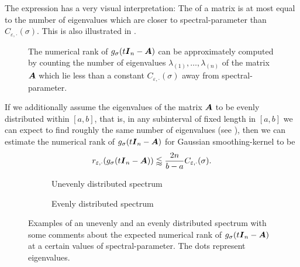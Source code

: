 The expression  has a very
visual interpretation: The  of a matrix is at most
equal to the number of eigenvalues which are closer to \gls{spectral-parameter}
than $C_{\varepsilon, \cdot}(\sigma)$.
This is also illustrated in .\\
\begin{figure}[ht]
    \centering
    
    \caption{The numerical rank of $g_{\sigma}(t\boldsymbol{I}_n - \boldsymbol{A})$ can be
        approximately computed by counting the number of eigenvalues
        $\lambda_{(1)}, \dots, \lambda_{(n)}$ of the matrix $\boldsymbol{A}$ which lie less than
        a constant $C_{\varepsilon, \cdot}(\sigma)$ away from \gls{spectral-parameter}.}
    \label{fig:3-nystrom-numerical-rank-constant}
\end{figure}

If we additionally assume the eigenvalues of the matrix $\boldsymbol{A}$
to be evenly distributed within $[a, b]$, that is, in any subinterval of fixed length in
$[a, b]$ we can expect to find roughly the same number of eigenvalues (see ), then
we can estimate the numerical rank of $g_{\sigma}(t\boldsymbol{I}_n - \boldsymbol{A})$
for Gaussian \gls{smoothing-kernel} to be
\begin{equation}
    r_{\varepsilon, \cdot}(g_{\sigma}(t\boldsymbol{I}_n - \boldsymbol{A})) \lessapprox \frac{2 n}{b - a} C_{\varepsilon, \cdot}(\sigma).
    \label{equ:3-nystrom-kernel-numerical-rank-even-eigenvalues}
\end{equation}

\begin{figure}[ht]
    \centering
    \begin{subfigure}[t]{0.45\columnwidth}
        
        \caption{Unevenly distributed spectrum}
    \end{subfigure}
    \begin{subfigure}[t]{0.45\columnwidth}
        
        \caption{Evenly distributed spectrum}
    \end{subfigure}
    \caption{Examples of an unevenly and an evenly distributed spectrum
    with some comments about the expected numerical rank of $g_{\sigma}(t\boldsymbol{I}_n - \boldsymbol{A})$
    at a certain values of \gls{spectral-parameter}.
    The dots represent eigenvalues.}
    \label{fig:3-nystrom-evenly-distributed-spectrum}
\end{figure}


